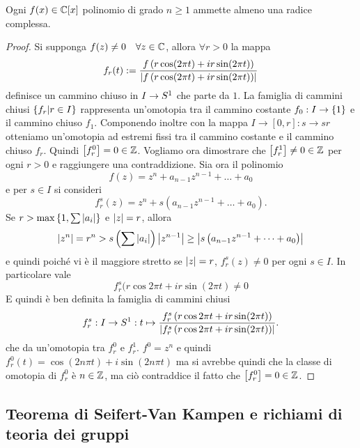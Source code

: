 \documentclass[]{article}
\begin{document}
\begin{theorem}  \nl
    Ogni $f(x) \in \mathbb{C}[x]$ polinomio di grado $n \geq 1$ ammette almeno una radice complessa.
\end{theorem}

\begin{proof} \nl
    Si supponga $f(z) \neq 0 \quad \forall z \in \mathbb{C}$, allora $\forall r > 0$ la mappa
    \[
        f_r(t) := \frac{f\left(r \cos(2\pi t) + ir\sin(2 \pi t)\right)}{\left| f\left(r \cos(2\pi t) + ir\sin(2 \pi t)\right) \right|}
    \]
    definisce un cammino chiuso in $I \to S^{1}$ che parte da $1$. \nl
    La famiglia di cammini chiusi $\left\{ f_r | r \in I \right\}$ rappresenta un'omotopia tra il cammino costante $f_0: I \to \left\{ 1 \right\}$ e il cammino chiuso
    $f_1$. \nl
    Componendo inoltre con la mappa $I \to [0,r]: s \to sr$ otteniamo un'omotopia ad estremi fissi tra il cammino costante e il cammino chiuso $f_r$. \nl
    Quindi $\left[f_r^0 \right] = 0 \in \mathbb{Z}$. Vogliamo ora dimostrare che $\left[f_r^1 \right] \neq 0 \in \mathbb{Z}$  per ogni $r > 0$ e raggiungere una contraddizione. \nl
    Sia ora il polinomio
    \[
        f(z) = z^n + a_{n-1}z^{n-1} + \ldots + a_0
    \]
    e per $s \in I$ si consideri
    \[
        f_r^s(z) = z^n + s\left( a_{n-1}z^{n-1} + \ldots + a_0 \right).
    \]
    Se $r > \max\left\{ 1, \sum \left| a_i \right| \right\}$ e $\left| z \right| = r$, allora
    \[
        \left| z^n \right| = r^n > s \left( \sum \left| a_i \right| \right) \left| z^{n-1} \right| \geq \left| s\left(a_{n-1}z^{n-1} + \dots + a_0\right) \right|
    \]
    e quindi poich\'e vi \`e il maggiore stretto se $\left| z \right| = r$, $f_r^s(z) \neq 0$ per ogni $s \in I$. \nl
    In particolare vale 
    \[
        f_r^s(r \cos{2\pi t} + ir\sin(2 \pi t) \neq 0 
    \]
    E quindi \`e ben definita la famiglia di cammini chiusi
    \[
        f_r^s: I \to S^{1}: t \mapsto \frac{f_r^s\left(r \cos{2\pi t} + ir\sin(2 \pi t)\right)}{\left| f_r^s\left(r \cos{2\pi t} + ir\sin(2 \pi t)\right) \right|}.
    \]
    che da un'omotopia tra $f_r^0$ e $f_r^1$. \nl
    $f^0 = z^n$ e quindi $f_r^0(t) = \cos(2 n \pi t) + i\sin(2 n \pi t)$
    ma si avrebbe quindi che la classe di omotopia di $f_r^0$ \`e $n \in \mathbb{Z}$, ma ci\`o contraddice il fatto che
    $\left[f_r^0 \right] = 0 \in \mathbb{Z}$.
\end{proof}

\subsection{Teorema di Seifert-Van Kampen e richiami di teoria dei gruppi}
\end{document}
